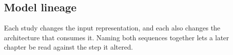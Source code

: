 \subsection{Model lineage}


Each study changes the input representation, and each also changes the architecture
that consumes it. Naming both sequences together lets a later chapter be read against
the step it altered.

